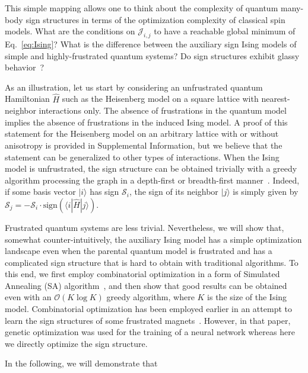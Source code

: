 This simple mapping allows one to think about the complexity of quantum many-body sign structures in terms of the optimization complexity of classical spin models. What are the conditions on $\mathcal{J}_{i,j}$ to have a reachable global minimum of Eq.~\eqref{eq:Ising}? What is the difference between the auxiliary sign Ising models of simple and highly-frustrated quantum systems? Do sign structures exhibit glassy behavior~\cite{glasses}?

As an illustration, let us start by considering an unfrustrated quantum Hamiltonian $\hat{H}$ such as the Heisenberg model on a square lattice with nearest-neighbor interactions only. The absence of frustrations in the quantum model implies the absence of frustrations in the induced Ising model. A proof of this statement for the Heisenberg model on an arbitrary lattice with or without anisotropy is provided in Supplemental Information, but we believe that the statement can be generalized to other types of interactions. When the Ising model is unfrustrated, the sign structure can be obtained trivially with a greedy algorithm processing the graph in a depth-first or breadth-first manner~\cite{CLRS}. Indeed, if some basis vector $|i\rangle$ has sign $\mathcal{S}_i$, the sign of its neighbor $|j\rangle$ is simply given by $\mathcal{S}_j = - \mathcal{S}_i \cdot \mbox{sign}(\langle i | \hat{H} |j\rangle)$.

Frustrated quantum systems are less trivial. Nevertheless, we will show that, somewhat counter-intuitively, the auxiliary Ising model has a simple optimization landscape even when the parental quantum model is frustrated and has a complicated sign structure that is hard to obtain with traditional algorithms. To this end, we first employ combinatorial optimization in a form of Simulated Annealing (SA) algorithm~\cite{SA}, and then show that good results can be obtained even with an $\mathcal{O}(K \log K)$ greedy algorithm, where $K$ is the size of the Ising model. Combinatorial optimization has been employed earlier in an attempt to learn the sign structures of some frustrated magnets~\cite{Nikita_sign}. However, in that paper, genetic optimization was used for the training of a neural network whereas here we directly optimize the sign structure.

In the following, we will demonstrate that

